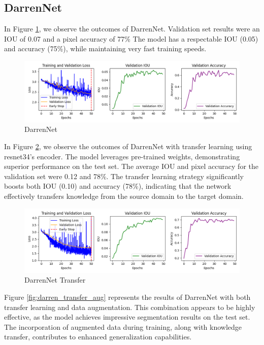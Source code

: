 \subsection*{DarrenNet}

In Figure \ref{fig:darren}, we observe the outcomes of DarrenNet. Validation set results were an IOU of 0.07 and a pixel accuracy of 77\% The model has a respectable IOU (0.05) and accuracy (75\%), while maintaining very fast training speeds.

\begin{figure}[H]
	\centering
	\includegraphics[width=\textwidth]{plots/darrennet}
	\caption{DarrenNet}
	\label{fig:darren}
\end{figure}


In Figure \ref{fig:darren_transfer}, we observe the outcomes of DarrenNet with transfer learning using resnet34's encoder. The model leverages pre-trained weights, demonstrating superior performance on the test set. The average IOU and pixel accuracy for the validation set were 0.12 and 78\%. The transfer learning strategy significantly boosts both IOU (0.10) and accuracy (78\%), indicating that the network effectively transfers knowledge from the source domain to the target domain.


\begin{figure}[H]
	\centering
	\includegraphics[width=\textwidth]{plots/darrennet_transfer}
	\caption{DarrenNet Transfer}
	\label{fig:darren_transfer}
\end{figure}


Figure \ref{fig:darren_transfer_aug} represents the results of DarrenNet with both transfer learning and data augmentation. This combination appears to be highly effective, as the model achieves impressive segmentation results on the test set. The incorporation of augmented data during training, along with knowledge transfer, contributes to enhanced generalization capabilities.

